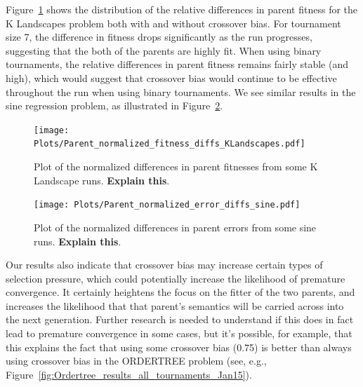 \documentclass{sig-alternate}
\begin{document}
Figure~\ref{fig:parentDiffsKLandscapes} shows the distribution of the relative differences
in parent fitness for the K Landscapes problem both with and without crossover bias.
For tournament size 7, the difference in fitness drops significantly 
as the run progresses, suggesting that the both of the parents are highly fit. 
When using binary tournaments, the relative differences in parent fitness remains fairly 
stable (and high), which would suggest that crossover bias would continue to be effective
throughout the run when using binary tournaments. We see similar
results in the sine regression problem, as illustrated in Figure~\ref{fig:parentDiffsSine}.

\begin{figure}
\centering
\texttt{[image: Plots/Parent\_normalized\_fitness\_diffs\_KLandscapes.pdf]}
\caption{Plot of the normalized differences in parent fitnesses from some K Landscape runs. \textbf{Explain this}.}
\label{fig:parentDiffsKLandscapes}
\end{figure}

\begin{figure}
	\centering
	\texttt{[image: Plots/Parent\_normalized\_error\_diffs\_sine.pdf]}
	\caption{Plot of the normalized differences in parent errors from some sine runs. \textbf{Explain this}.}
	\label{fig:parentDiffsSine}
\end{figure}

Our results also indicate that crossover bias may increase certain types of selection pressure, 
which could potentially increase the likelihood of premature convergence.
It certainly heightens the focus on the fitter of the two parents, and increases the likelihood
that that parent's semantics will be carried across into the next generation. Further research is
needed to understand if this does in fact lead to premature convergence in some cases, but it's
possible, for example, that this explains the fact that using some crossover bias (0.75) is better 
than always using crossover bias in the ORDERTREE problem (see, e.g., 
Figure~\ref{fig:Ordertree_results_all_tournaments_Jan15}).

\end{document}
